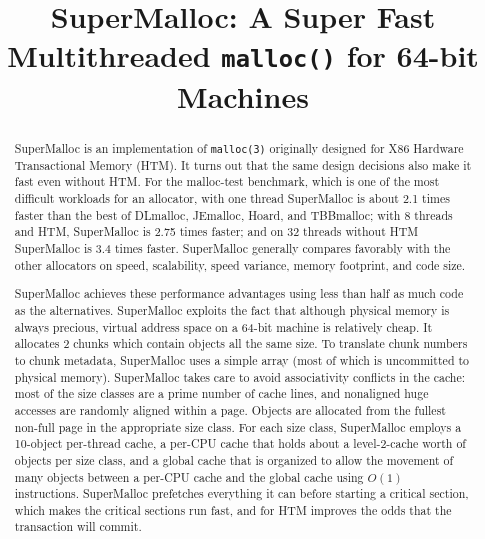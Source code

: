 \documentclass[natbib,sort&compress,10pt]{sigplanconf}
\begin{document}
\setlength{\pdfpageheight}{\paperheight}
\setlength{\pdfpagewidth}{\paperwidth}

\title{SuperMalloc: A Super Fast Multithreaded \texttt{malloc()} for 64-bit Machines}
\date{}
\maketitle
\begin{abstract}

SuperMalloc is an implementation of \texttt{malloc(3)} originally
designed for X86 Hardware Transactional Memory (HTM)\@.  It turns out
that the same design decisions also make it fast even without HTM\@.
For the malloc-test benchmark, which is one of the most difficult
workloads for an allocator, with one thread SuperMalloc is about 2.1
times faster than the best of DLmalloc, JEmalloc, Hoard, and
TBBmalloc; with 8 threads and HTM, SuperMalloc is 2.75 times faster;
and on 32 threads without HTM SuperMalloc is 3.4 times faster.
SuperMalloc generally compares favorably with the other allocators on
speed, scalability, speed variance, memory footprint, and code size.

SuperMalloc achieves these performance advantages using less than half
as much code as the alternatives.  SuperMalloc exploits the fact that
although physical memory is always precious, virtual address space on
a 64-bit machine is relatively cheap.  It allocates
\unit{2}\mebi\byte{} chunks which contain objects all the same size.
To translate chunk numbers to chunk metadata, SuperMalloc uses a
simple array (most of which is uncommitted to physical memory).
SuperMalloc takes care to avoid associativity conflicts in the cache:
most of the size classes are a prime number of cache lines, and
nonaligned huge accesses are randomly aligned within a page.  Objects
are allocated from the fullest non-full page in the appropriate size
class.  For each size class, SuperMalloc employs a 10-object
per-thread cache, a per-CPU cache that holds about a level-2-cache
worth of objects per size class, and a global cache that is organized
to allow the movement of many objects between a per-CPU cache and the
global cache using $O(1)$ instructions.  SuperMalloc prefetches
everything it can before starting a critical section, which makes the
critical sections run fast, and for HTM improves the odds that the
transaction will commit.

\end{abstract}
\end{document}
